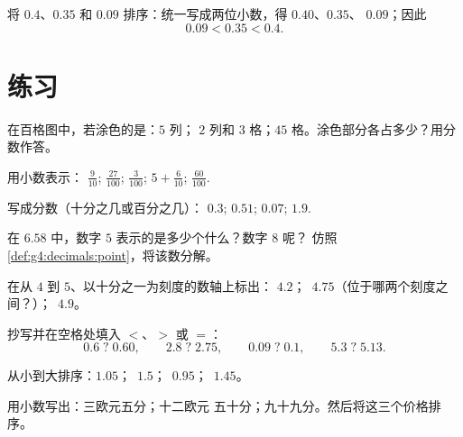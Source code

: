 \begin{example}\label{ex:g4:decimals:compare}
将 $0.4$、$0.35$ 和 $0.09$ 排序：统一写成两位小数，得 $0.40$、$0.35$、
$0.09$；因此
\[
0.09 < 0.35 < 0.4 .
\]
\end{example}

\section{练习}

\begin{exercise}[$\star$]\label{exo:g4:decimals:1}
在百格图中，若涂色的是：$5$ 列；
$2$ 列和 $3$ 格；$45$ 格。涂色部分各占多少？用分数作答。
\end{exercise}

\begin{exercise}[$\star$]\label{exo:g4:decimals:2}
用小数表示：
$\frac{9}{10}$; \quad $\frac{27}{100}$; \quad $\frac{3}{100}$; \quad
$5 + \frac{6}{10}$; \quad $\frac{60}{100}$.
\end{exercise}

\begin{exercise}[$\star$]\label{exo:g4:decimals:3}
写成分数（十分之几或百分之几）：
$0.3$; \quad $0.51$; \quad $0.07$; \quad $1.9$.
\end{exercise}

\begin{exercise}[$\star$]\label{exo:g4:decimals:4}
在 $6.58$ 中，数字 $5$ 表示的是多少个什么？数字 $8$ 呢？
仿照\cref{def:g4:decimals:point}，将该数分解。
\end{exercise}

\begin{exercise}[$\star$]\label{exo:g4:decimals:5}
在从 $4$ 到 $5$、以十分之一为刻度的数轴上标出：
$4.2$；\ $4.75$（位于哪两个刻度之间？）；\ $4.9$。
\end{exercise}

\begin{exercise}[$\star$]\label{exo:g4:decimals:6}
抄写并在空格处填入 $<$、$>$ 或 $=$：
\[
0.6 \;?\; 0.60, \qquad
2.8 \;?\; 2.75, \qquad
0.09 \;?\; 0.1, \qquad
5.3 \;?\; 5.13 .
\]
\end{exercise}

\begin{exercise}[$\star$]\label{exo:g4:decimals:7}
从小到大排序：$1.05$；\ $1.5$；\ $0.95$；\ $1.45$。
\end{exercise}

\begin{exercise}[$\star$]\label{exo:g4:decimals:8}
用小数写出：三欧元五分；十二欧元
五十分；九十九分。然后将这三个价格排序。
\end{exercise}

